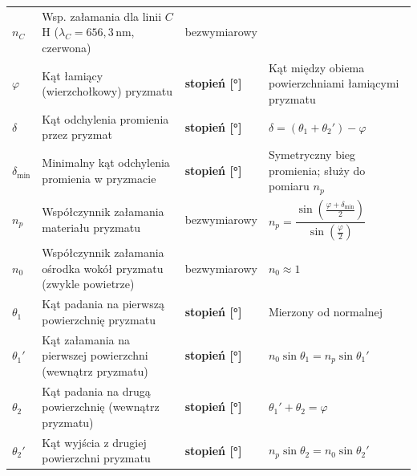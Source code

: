 \documentclass[12pt,a4paper]{article}
\begin{document}
\begin{longtable}{>{\bfseries}p{1.6cm} p{6.5cm} p{3.2cm} p{3.5cm}}
\rowcolor{rowrozs}
$n_C$   & Wsp. załamania dla linii $C$ H
          ($\lambda_C = 656{,}3\,\mathrm{nm}$, czerwona)
        & bezwymiarowy
        & \\

\rowcolor{rowrozs}
$\varphi$ & Kąt łamiący (wierzchołkowy) pryzmatu
        & \textbf{stopień [°]}
        & Kąt między obiema powierzchniami
          łamiącymi pryzmatu \\

\rowcolor{rowrozs}
$\delta$ & Kąt odchylenia promienia przez pryzmat
        & \textbf{stopień [°]}
        & $\delta = (\theta_1 + \theta_2') - \varphi$ \\

\rowcolor{rowrozs}
$\delta_{\min}$ & Minimalny kąt odchylenia promienia
                  w pryzmacie
        & \textbf{stopień [°]}
        & Symetryczny bieg promienia;
          służy do pomiaru $n_p$ \\

\rowcolor{rowrozs}
$n_p$   & Współczynnik załamania materiału pryzmatu
        & bezwymiarowy
        & $n_p = \dfrac{\sin\!\left(\frac{\varphi+\delta_{\min}}{2}\right)}%
                       {\sin\!\left(\frac{\varphi}{2}\right)}$ \\

\rowcolor{rowrozs}
$n_0$   & Współczynnik załamania ośrodka wokół
          pryzmatu (zwykle powietrze)
        & bezwymiarowy
        & $n_0 \approx 1$ \\

\rowcolor{rowrozs}
$\theta_1$ & Kąt padania na pierwszą powierzchnię
             pryzmatu
        & \textbf{stopień [°]}
        & Mierzony od normalnej \\

\rowcolor{rowrozs}
$\theta_1'$ & Kąt załamania na pierwszej powierzchni
              (wewnątrz pryzmatu)
        & \textbf{stopień [°]}
        & $n_0\sin\theta_1 = n_p\sin\theta_1'$ \\

\rowcolor{rowrozs}
$\theta_2$ & Kąt padania na drugą powierzchnię
             (wewnątrz pryzmatu)
        & \textbf{stopień [°]}
        & $\theta_1' + \theta_2 = \varphi$ \\

\rowcolor{rowrozs}
$\theta_2'$ & Kąt wyjścia z drugiej powierzchni
              pryzmatu
        & \textbf{stopień [°]}
        & $n_p\sin\theta_2 = n_0\sin\theta_2'$ \\

\end{longtable}
\end{document}
